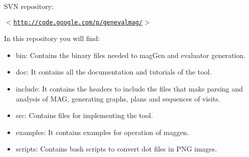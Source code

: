 SVN repository:\par
\par
$<$\href{http://code.google.com/p/genevalmag/}{\tt http://code.google.com/p/genevalmag/}$>$
\par
In this repository you will find:\par
\begin{itemize}
\item bin: Contains the binary files needed to magGen and evaluator generation.

\item doc: It contains all the documentation and tutorials of the tool.

\item include: It contains the headers to include the files that make parsing and analysis of MAG, generating graphs, plans and sequences of visits.

\item src: Contains files for implementing the tool.

\item examples: It contains examples for operation of maggen.

\item scripts: Contains bash scripts to convert dot files in PNG images.

\end{itemize}




